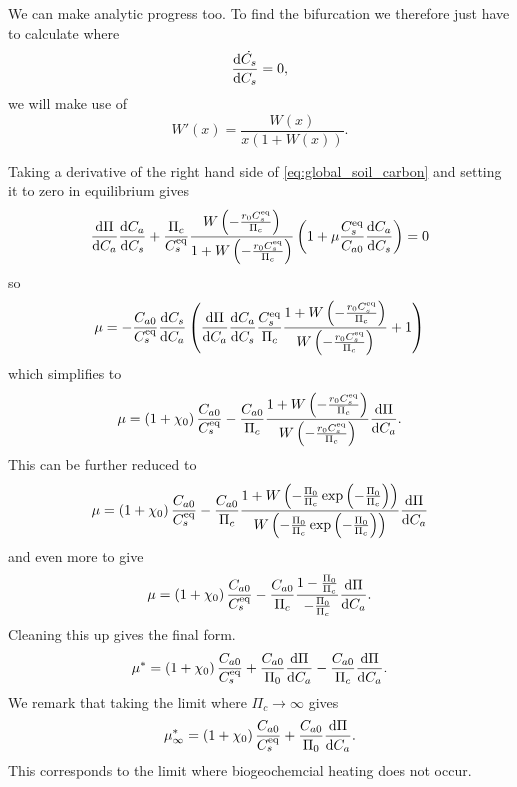 We can make analytic progress too. To find the bifurcation we therefore just have to calculate where
\begin{equation*}
  \dv{\dot{C_s}}{C_s} = 0,
\end{equation*}
we will make use of
\begin{equation}
  \label{eq:derivative_of_lambert_W}
  W'(x) = \frac{W(x)}{x\left(1 + W\left(x\right)\right)}.
\end{equation}




Taking a derivative of the right hand side of \cref{eq:global_soil_carbon} and setting it to zero in equilibrium gives
\begin{equation}
  \label{eq:soil_carbon_lambda}
  \dv{\Pi}{C_a}\dv{C_a}{C_s} + \frac{\Pi_c}{C_s^{\mathrm{eq}}} \frac{W\left(-\frac{r_0C_s^{\mathrm{eq}}}{\Pi_c}\right)}{1+W\left(-\frac{r_0C_s^{\mathrm{eq}}}{\Pi_c}\right)} \left(
    1 + \mu \frac{C_s^{\mathrm{eq}}}{C_{a0}} \dv{C_a}{C_s}\right) = 0
\end{equation}
so
\begin{equation}
  \label{eq:critical_mu}
  \mu = -\frac{C_{a0}}{C_{s}^{\mathrm{eq}}}\dv{C_s}{C_a}\left(\dv{\Pi}{C_a}\dv{C_a}{C_s} \frac{C_s^{\mathrm{eq}}}{\Pi_c}\frac{1+W\left(-\frac{r_0C_s^{\mathrm{eq}}}{\Pi_c}\right)}{W\left(-\frac{r_0C_s^{\mathrm{eq}}}{\Pi_c}\right)} + 1 \right)
\end{equation}
which simplifies to
\begin{equation}
  \label{eq:critical_mu_simple_ocean}
  \mu = \left(1+\chi_0\right) \frac{C_{a0}}{C_{s}^{\mathrm{eq}}} -
  \frac{C_{a0}}{\Pi_c}\frac{1+W\left(-\frac{r_0C_s^{\mathrm{eq}}}{\Pi_c}\right)}{W\left(-\frac{r_0C_s^{\mathrm{eq}}}{\Pi_c}\right)}\dv{\Pi}{C_a}.
\end{equation}
This can be further reduced to
\begin{equation*}
  \mu = \left(1+\chi_0\right) \frac{C_{a0}}{C_{s}^{\mathrm{eq}}} -
  \frac{C_{a0}}{\Pi_c}
  \frac{1+W\left(-\frac{\Pi_0}{\Pi_c}\exp\left(-\frac{\Pi_0}{\Pi_c}\right)\right)}
  {W\left(-\frac{\Pi_0}{\Pi_c}\exp\left(-\frac{\Pi_0}{\Pi_c}\right)\right)}\dv{\Pi}{C_a} 
\end{equation*}
and even more to give
\begin{equation*}
  \mu = \left(1+\chi_0\right) \frac{C_{a0}}{C_{s}^{\mathrm{eq}}} -
  \frac{C_{a0}}{\Pi_c}
  \frac{1-\frac{\Pi_0}{\Pi_c}}{-\frac{\Pi_0}{\Pi_c}}\dv{\Pi}{C_a}.
\end{equation*}
Cleaning this up gives the final form.
\begin{equation}
  \label{eq:critical_mu_simple_ocean_in_terms_of_npp}
  \mu^* = \left(1+\chi_0\right) \frac{C_{a0}}{C_{s}^{\mathrm{eq}}} +
  \frac{C_{a0}}{\Pi_0} \dv{\Pi}{C_a} - \frac{C_{a0}}{\Pi_c}\dv{\Pi}{C_a}.
\end{equation}
We remark that taking the limit where $\Pi_c \rightarrow \infty$ gives
\begin{equation}
  \label{eq:mu_infinity}
  \mu^*_{\infty} =\left(1+\chi_0\right) \frac{C_{a0}}{C_{s}^{\mathrm{eq}}} +
  \frac{C_{a0}}{\Pi_0} \dv{\Pi}{C_a}.
\end{equation}
This corresponds to the limit where biogeochemcial heating does not occur.

